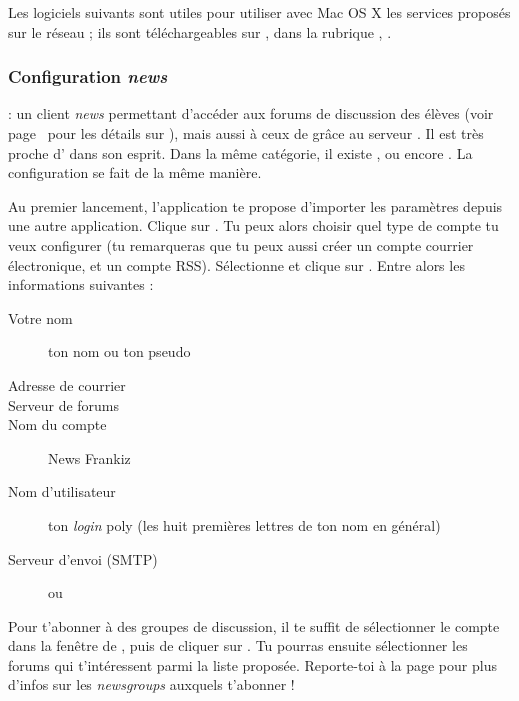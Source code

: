 
Les logiciels suivants sont utiles pour utiliser avec Mac OS X les services propos\'es sur le r\'eseau ; ils sont t\'el\'echargeables sur , dans la rubrique , .

\subsubsection{Configuration \emph{news}}

 : un client \emph{news} permettant d'acc\'eder aux forums de discussion des \'el\`eves (voir page~\pageref{newsgroups} pour les d\'etails sur ), mais aussi \`a  ceux de  gr\^ace au serveur . Il est tr\`es proche d' dans son esprit. Dans la m\^eme cat\'egorie, il existe ,  ou encore . La configuration se fait de la m\^eme mani\`ere.

Au premier lancement, l'application te propose d'importer les param\`etres depuis une autre application. Clique sur . Tu peux alors choisir quel type de compte tu veux configurer (tu remarqueras que tu peux aussi cr\'eer un compte courrier \'electronique, et un compte RSS). S\'electionne  et clique sur . Entre alors les informations suivantes :

\begin{description}
  \item[Votre nom] ton nom ou ton pseudo
  \item[Adresse de courrier] 
  \item[Serveur de forums] 
  \item[Nom du compte] News Frankiz
  \item[Nom d'utilisateur] ton \emph{login }poly (les huit premi\`eres lettres de ton nom en g\'en\'eral)
  \item[Serveur d'envoi (SMTP)]  ou 
\end{description}


Pour t'abonner \`a  des groupes de discussion, il te suffit de s\'electionner le compte  dans la fen\^etre  de , puis de cliquer sur . Tu pourras ensuite s\'electionner les forums qui t'int\'eressent parmi la liste propos\'ee. Reporte-toi \`a  la page \pageref{newsgroups} pour plus d'infos sur les \emph{newsgroups} auxquels t'abonner !

